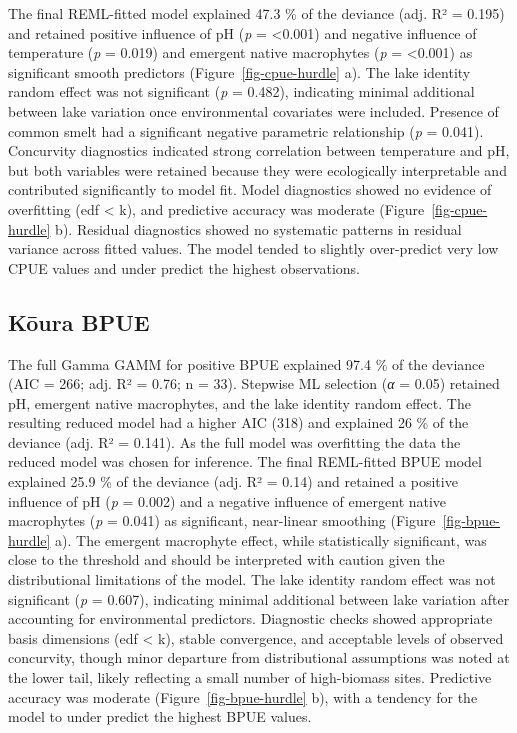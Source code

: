 \documentclass[
  letterpaper,
  DIV=11,
  numbers=noendperiod]{scrartcl}
\begin{document}
The final REML-fitted model explained 47.3 \% of the deviance (adj. R² =
0.195) and retained positive influence of pH (\emph{p} = \textless0.001)
and negative influence of temperature (\emph{p} = 0.019) and emergent
native macrophytes (\emph{p} = \textless0.001) as significant smooth
predictors (Figure~\ref{fig-cpue-hurdle} a). The lake identity random
effect was not significant (\emph{p} = 0.482), indicating minimal
additional between lake variation once environmental covariates were
included. Presence of common smelt had a significant negative parametric
relationship (\emph{p} = 0.041). Concurvity diagnostics indicated strong
correlation between temperature and pH, but both variables were retained
because they were ecologically interpretable and contributed
significantly to model fit. Model diagnostics showed no evidence of
overfitting (edf \textless{} k), and predictive accuracy was moderate
(Figure~\ref{fig-cpue-hurdle} b). Residual diagnostics showed no
systematic patterns in residual variance across fitted values. The model
tended to slightly over-predict very low CPUE values and under predict
the highest observations.

\subsection{Kōura BPUE}\label{kux14dura-bpue}

The full Gamma GAMM for positive BPUE explained 97.4 \% of the deviance
(AIC = 266; adj. R² = 0.76; n = 33). Stepwise ML selection (\emph{α} =
0.05) retained pH, emergent native macrophytes, and the lake identity
random effect. The resulting reduced model had a higher AIC (318) and
explained 26 \% of the deviance (adj. R² = 0.141). As the full model was
overfitting the data the reduced model was chosen for inference. The
final REML-fitted BPUE model explained 25.9 \% of the deviance (adj. R²
= 0.14) and retained a positive influence of pH (\emph{p} = 0.002) and a
negative influence of emergent native macrophytes (\emph{p} = 0.041) as
significant, near-linear smoothing (Figure~\ref{fig-bpue-hurdle} a). The
emergent macrophyte effect, while statistically significant, was close
to the threshold and should be interpreted with caution given the
distributional limitations of the model. The lake identity random effect
was not significant (\emph{p} = 0.607), indicating minimal additional
between lake variation after accounting for environmental predictors.
Diagnostic checks showed appropriate basis dimensions (edf \textless{}
k), stable convergence, and acceptable levels of observed concurvity,
though minor departure from distributional assumptions was noted at the
lower tail, likely reflecting a small number of high-biomass sites.
Predictive accuracy was moderate (Figure~\ref{fig-bpue-hurdle} b), with
a tendency for the model to under predict the highest BPUE values.
\end{document}
